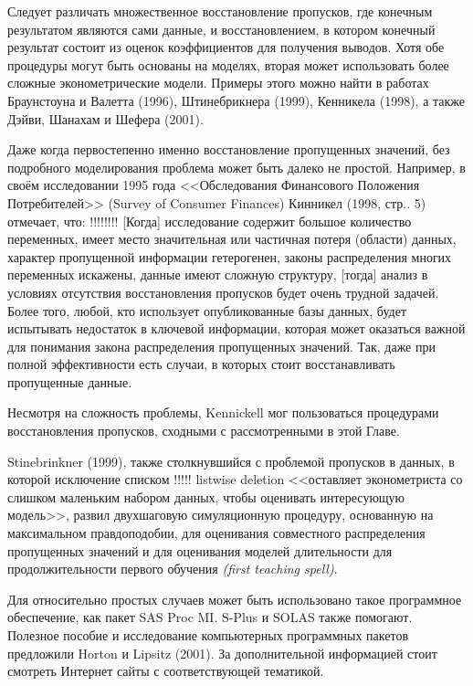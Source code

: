 Следует различать множественное восстановление пропусков, где конечным результатом являются сами данные, и восстановлением, в котором конечный результат состоит из оценок коэффициентов для получения выводов. Хотя обе процедуры могут быть основаны на моделях, вторая может использовать более сложные эконометрические модели. Примеры этого можно найти в работах Браунстоуна и Валетта (1996), Штинебрикнера (1999), Кенникела (1998), а также Дэйви, Шанахам и Шефера (2001).

Даже когда первостепенно именно восстановление пропущенных значений, без подробного моделирования проблема может быть далеко не простой. Например, в своём исследовании 1995 года <<Обследования Финансового Положения Потребителей>> (Survey of Consumer Finances) Кинникел (1998, стр.. 5) отмечает, что:
!!!!!!!!
[Когда] исследование содержит большое количество переменных, имеет место значительная или частичная потеря (области) данных, характер пропущенной информации гетерогенен, законы распределения многих переменных искажены, данные имеют сложную структуру, [тогда] анализ в условиях отсутствия восстановления пропусков будет очень трудной задачей. Более того, любой, кто использует опубликованные базы данных, будет испытывать недостаток в ключевой информации, которая может оказаться важной для понимания закона распределения пропущенных значений. Так, даже при полной эффективности есть случаи, в которых стоит восстанавливать пропущенные данные.

Несмотря на сложность проблемы, Kennickell мог пользоваться процедурами восстановления пропусков, сходными с рассмотренными в этой Главе.

Stinebrinkner (1999), также столкнувшийся с проблемой пропусков в данных, в которой исключение списком !!!!! listwise deletion <<оставляет эконометриста со слишком маленьким набором данных, чтобы оценивать интересующую модель>>, развил двухшаговую симуляционную процедуру, основанную на максимальном правдоподобии, для оценивания совместного распределения пропущенных значений и для оценивания моделей длительности для продолжительности первого обучения \emph{(first teaching spell)}.

Для относительно простых случаев может быть использовано такое программное обеспечение, как пакет SAS Proc MI. S-Plus и SOLAS также помогают. Полезное пособие и исследование компьютерных программных пакетов предложили Horton и Lipsitz (2001). За дополнительной информацией стоит смотреть Интернет сайты с соответствующей тематикой.

